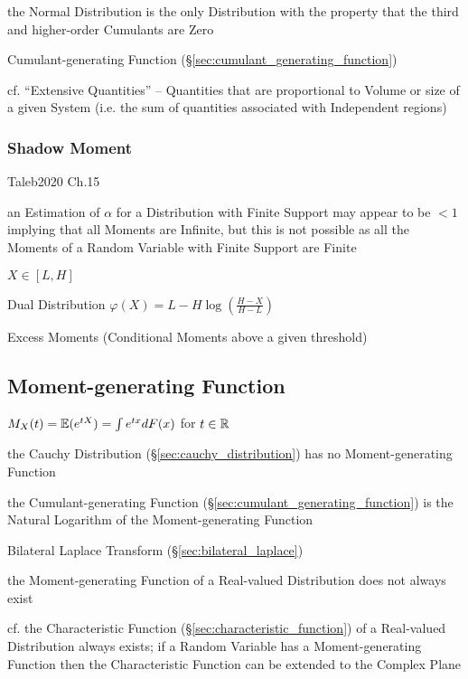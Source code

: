 the Normal Distribution is the only Distribution with the property that the
third and higher-order Cumulants are Zero

\fist Cumulant-generating Function (\S\ref{sec:cumulant_generating_function})

cf. ``Extensive Quantities'' -- Quantities that are proportional to Volume or
size of a given System (i.e. the sum of quantities associated with Independent
regions)



\subsubsection{Shadow Moment}\label{sec:shadow_moment}

Taleb2020 Ch.15

an Estimation of $\alpha$ for a Distribution with Finite Support may appear to
be $< 1$ implying that all Moments are Infinite, but this is not possible as all
the Moments of a Random Variable with Finite Support are Finite

$X \in [L, H]$

Dual Distribution $\varphi(X) = L - H \log(\frac{H - X}{H - L})$

Excess Moments (Conditional Moments above a given threshold)



\subsection{Moment-generating Function}\label{sec:moment_generating_function}

$M_X(t) = \mathbb{E}(e^{tX}) = \int e^{tx} dF(x)$ for $t \in \mathbb{R}$

the Cauchy Distribution (\S\ref{sec:cauchy_distribution}) has no
Moment-generating Function

the Cumulant-generating Function (\S\ref{sec:cumulant_generating_function}) is
the Natural Logarithm of the Moment-generating Function

\fist Bilateral Laplace Transform (\S\ref{sec:bilateral_laplace})

the Moment-generating Function of a Real-valued Distribution does not always
exist

cf. the Characteristic Function (\S\ref{sec:characteristic_function}) of a
Real-valued Distribution always exists; if a Random Variable has a
Moment-generating Function then the Characteristic Function can be extended to
the Complex Plane

